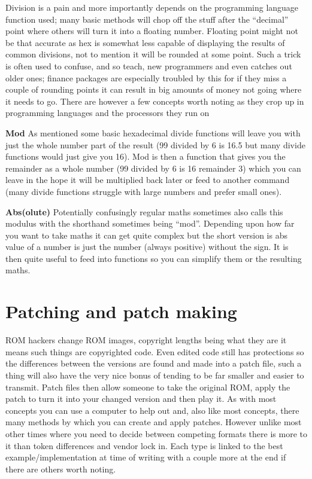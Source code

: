 \documentclass[
]{book}
\begin{document}
Division is a pain and more importantly depends on the programming language function used; many basic methods will chop off the stuff after the ``decimal'' point where others will turn it into a floating number. Floating point might not be that accurate as hex is somewhat less capable of displaying the results of common divisions, not to mention it will be rounded at some point. Such a trick is often used to confuse, and so teach, new programmers and even catches out older ones; finance packages are especially troubled by this for if they miss a couple of rounding points it can result in big amounts of money not going where it needs to go. There are however a few concepts worth noting as they crop up in programming languages and the processors they run on

\textbf{Mod} As mentioned some basic hexadecimal divide functions will leave you with just the whole number part of the result (99 divided by 6 is 16.5 but many divide functions would just give you 16). Mod is then a function that gives you the remainder as a whole number (99 divided by 6 is 16 remainder 3) which you can leave in the hope it will be multiplied back later or feed to another command (many divide functions struggle with large numbers and prefer small ones).

\textbf{Abs(olute)} Potentially confusingly regular maths sometimes also calls this modulus with the shorthand sometimes being ``mod''. Depending upon how far you want to take maths it can get quite complex but the short version is abs value of a number is just the number (always positive) without the sign. It is then quite useful to feed into functions so you can simplify them or the resulting maths.

\hypertarget{patching-and-patch-making}{%
\section{Patching and patch making}\label{patching-and-patch-making}}

ROM hackers change ROM images, copyright lengths being what they are it means such things are copyrighted code. Even edited code still has protections so the differences between the versions are found and made into a patch file, such a thing will also have the very nice bonus of tending to be far smaller and easier to transmit. Patch files then allow someone to take the original ROM, apply the patch to turn it into your changed version and then play it. As with most concepts you can use a computer to help out and, also like most concepts, there many methods by which you can create and apply patches. However unlike most other times where you need to decide between competing formats there is more to it than token differences and vendor lock in. Each type is linked to the best example/implementation at time of writing with a couple more at the end if there are others worth noting.
\end{document}
